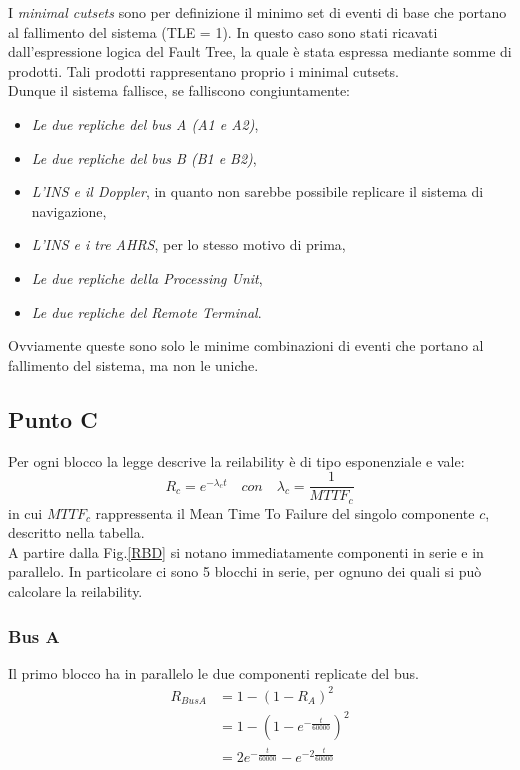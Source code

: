 I \textit{minimal cutsets} sono per definizione il minimo set di eventi di base che portano al fallimento del sistema (TLE = 1). In questo caso sono stati ricavati dall'espressione logica del Fault Tree, la quale è stata espressa mediante somme di prodotti. Tali prodotti rappresentano proprio i minimal cutsets.
\\
Dunque il sistema fallisce, se falliscono congiuntamente:
\begin{itemize}
	\item \textit{Le due repliche del bus A (A1 e A2)},
	\item \textit{Le due repliche del bus B (B1 e B2)},
	\item \textit{L'INS e il Doppler}, in quanto non sarebbe possibile replicare il sistema di navigazione,
	\item \textit{L'INS e i tre AHRS}, per lo stesso motivo di prima,
	\item \textit{Le due repliche della Processing Unit},
	\item \textit{Le due repliche del Remote Terminal}.
\end{itemize}
Ovviamente queste sono solo le minime combinazioni di eventi che portano al fallimento del sistema, ma non le uniche.

\subsection{Punto C}
Per ogni blocco la legge descrive la reilability è di tipo esponenziale e vale:
\begin{equation*}
	R_c = e^{-\lambda_c t} \quad con \quad \lambda_c=\dfrac{1}{MTTF_c}
\end{equation*}
in cui $MTTF_c$ rappressenta il Mean Time To Failure del singolo componente $c$, descritto nella tabella.
\\A partire dalla Fig.\ref{RBD} si notano immediatamente componenti in serie e in parallelo. In particolare ci sono 5 blocchi in serie, per ognuno dei quali si può calcolare la reilability.
\subsubsection{Bus A}
Il primo blocco ha in parallelo le due componenti replicate del bus.
\begin{equation*}
	\begin{split}
		R_{BusA} &= 1-(1-R_A)^2 \\
		&= 1-(1-e^{-\frac{t}{60000}})^2 \\
		&= 2e^{-\frac{t}{60000}} - e^{-2\frac{t}{60000}}
	\end{split}
\end{equation*}
